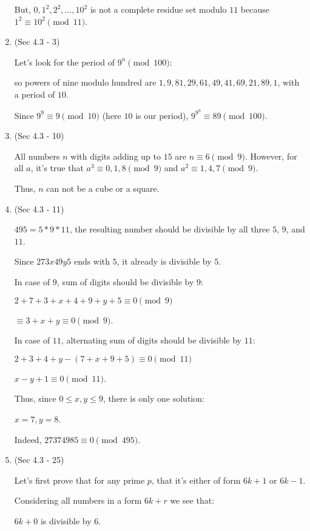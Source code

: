 \documentclass[12pt]{article}
\begin{document}
\begin{enumerate}
    But, $0, 1^2, 2^2, ..., 10^2$ is not a complete residue set modulo $11$ because $1^2 \equiv 10^2 \pmod {11}$.

  \item
    (Sec 4.3 - 3)

    Let's look for the period of $9^n \pmod {100}$:

    so powers of nine modulo hundred are $1, 9, 81, 29, 61, 49, 41, 69, 21, 89, 1$, with a period of $10$.

    Since $9^9 \equiv 9 \pmod {10}$ (here $10$ is our period), $9^{9^9} \equiv 89 \pmod {100}$.

  \item
    (Sec 4.3 - 10)

    All numbers $n$ with digits adding up to $15$ are $n \equiv 6 \pmod 9$. However,
    for all $a$, it's true that $a^3 \equiv 0, 1, 8 \pmod 9$ and $a^2 \equiv 1, 4, 7 \pmod 9$.

    Thus, $n$ can not be a cube or a square.

  \item
    (Sec 4.3 - 11)

    $495 = 5 * 9 * 11$, the resulting number should be divisible by all three $5$, $9$, and $11$.

    Since $273x49y5$ ends with $5$, it already is divisible by $5$.

    In case of $9$, sum of digits should be divisible by $9$:

    $2 + 7 + 3 + x + 4 + 9 + y + 5 \equiv 0 \pmod 9$

    $\equiv 3 + x + y \equiv 0 \pmod 9$.

    In case of $11$, alternating sum of digits should be divisible by $11$:

    $2 + 3 + 4 + y - (7 + x + 9 + 5) \equiv 0 \pmod {11}$

    $x - y + 1 \equiv 0 \pmod{11}$.

    Thus, since $0 \leq x, y \leq 9$, there is only one solution: 

    $x = 7, y = 8$.

    Indeed, $27374985 \equiv 0 \pmod{495}$.

  \item
    (Sec 4.3 - 25)

    Let's first prove that for any prime $p$, that it's either of form $6k + 1$ or $6k - 1$.

    Considering all numbers in a form $6k + r$ we see that:

    $6k + 0$ is divisible by $6$.


\end{enumerate}
\end{document}
